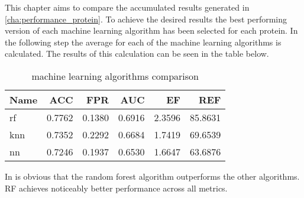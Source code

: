 This chapter aims to compare the accumulated results generated in \ref{cha:performance_protein}.
To achieve the desired results the best performing version of each machine learning algorithm has been selected for each protein.
In the following step the average for each of the machine learning algorithms is calculated.
The results of this calculation can be seen in the table below.

\begin{table}[H]
    \begin{center}
        \caption{machine learning algorithms comparison}
        \begin{tabular}{lrrrrr}
            \toprule
            Name & ACC    & FPR    & AUC    & EF     & REF     \\
            \midrule
            rf   & 0.7762 & 0.1380 & 0.6916 & 2.3596 & 85.8631 \\
            knn  & 0.7352 & 0.2292 & 0.6684 & 1.7419 & 69.6539 \\
            nn   & 0.7246 & 0.1937 & 0.6530 & 1.6647 & 63.6876 \\
            \bottomrule
        \end{tabular}
    \end{center}
\end{table}

In is obvious that the random forest algorithm outperforms the other algorithms. 
RF achieves noticeably better performance across all metrics.  